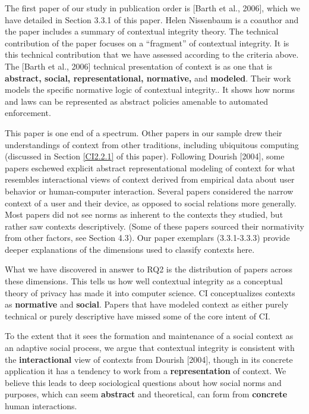 \documentclass[../thesis.tex]{subfiles}
\begin{document}
The first paper of our study in publication order is [Barth et al.,
2006], which we have detailed in Section 3.3.1 of this paper. Helen
Nissenbaum is a coauthor and the paper includes a summary of contextual
integrity theory. The technical contribution of the paper focuses on a
``fragment'' of contextual
integrity. It is this technical contribution that we have assessed
according to the criteria above. The [Barth et al., 2006] technical
presentation of context is as one that is \textbf{abstract, social,
representational, normative, }and\textbf{ modeled}. Their work models
the specific normative logic of contextual integrity.. It shows how
norms and laws can be represented as abstract policies amenable to
automated enforcement.

This paper is one end of a spectrum. Other papers in our sample drew
their understandings of context from other traditions, including
ubiquitous computing (discussed in Section \ref{CI2.2.1} of this paper).
Following Dourish [2004], some papers eschewed explicit abstract
representational modeling of context for what resembles interactional
views of context derived from empirical data about user behavior or
human-computer interaction. Several papers considered the narrow
context of a user and their device, as opposed to social relations more
generally. Most papers did not see norms as inherent to the contexts
they studied, but rather saw contexts descriptively. (Some of these
papers sourced their normativity from other factors, see Section 4.3).
Our paper exemplars (3.3.1-3.3.3) provide deeper explanations of the
dimensions used to classify contexts here.

What we have discovered in answer to RQ2 is the distribution of papers
across these dimensions. This tells us how well contextual integrity as
a conceptual theory of privacy has made it into computer science. CI
conceptualizes contexts as \textbf{normative} and \textbf{social}.
Papers that have modeled context as either purely technical or purely
descriptive have missed some of the core intent of CI.

To the extent that it sees the formation and maintenance of a social
context as an adaptive social process, we argue that contextual
integrity is consistent with the \textbf{interactional }view of
contexts from Dourish [2004], though in its concrete application it has
a tendency to work from a \textbf{representation} of context. We
believe this leads to deep sociological questions about how social
norms and purposes, which can seem \textbf{abstract} and theoretical,
can form from \textbf{concrete} human interactions. 
\end{document}
